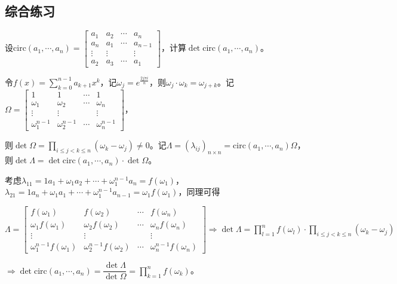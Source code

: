         \subsection{综合练习}

            \begin{example}[(轮换矩阵的行列式)]
                设$\mathrm{circ}(a_1,\cdots,a_n)=\begin{bmatrix}a_1&a_2&\cdots&a_n\\a_n&a_1&\cdots&a_{n-1}\\\vdots&\vdots&&\vdots\\a_2&a_3&\cdots&a_1\end{bmatrix}$，计算$\det\mathrm{circ}(a_1,\cdots,a_n)$。
            \end{example}
    
            \begin{solution}
                令$f(x)=\sum\limits_{k=0}^{n-1}a_{k+1}x^k$，记$\omega_j=e^{\frac{2j\pi i}{n}}$，则$\omega_j\cdot\omega_k=\omega_{j+k}$。记$\Omega=\begin{bmatrix}1&1&\cdots&1\\\omega_1&\omega_2&\cdots&\omega_n\\\vdots&\vdots&&\vdots\\\omega_1^{n-1}&\omega_2^{n-1}&\cdots&\omega_n^{n-1}\end{bmatrix}$，
    
                则$\det\Omega=\prod\limits_{i\leq j<k\leq n}(\omega_k-\omega_j)\neq0$。记$\Lambda=(\lambda_{ij})_{n\times n}=\mathrm{circ}(a_1,\cdots,a_n)\Omega$，则$\det\Lambda=\det\mathrm{circ}(a_1,\cdots,a_n)\cdot\det\Omega$。
    
                考虑$\lambda_{11}=1a_1+\omega_1 a_2+\cdots+\omega_1^{n-1}a_n=f(\omega_1)$，$\lambda_{21}=1a_n+\omega_1 a_1+\cdots+\omega_1^{n-1}a_{n-1}=\omega_1 f(\omega_1)$，同理可得
    
                $\Lambda=\begin{bmatrix}f(\omega_1)&f(\omega_2)&\cdots&f(\omega_n)\\\omega_1 f(\omega_1)&\omega_2 f(\omega_2)&\cdots&\omega_n f(\omega_n)\\\vdots&\vdots&&\vdots\\\omega_1^{n-1} f(\omega_1)&\omega_2^{n-1} f(\omega_2)&\cdots&\omega_n^{n-1} f(\omega_n)\end{bmatrix}\Rightarrow\det\Lambda=\prod\limits_{l=1}^n f(\omega_l)\cdot\prod\limits_{i\leq j<k\leq n}(\omega_k-\omega_j)$
    
                $\Rightarrow \det\mathrm{circ}(a_1,\cdots,a_n)=\dfrac{\det\Lambda}{\det\Omega}=\prod\limits_{k=1}^n f(\omega_k)$。
            \end{solution}
    
